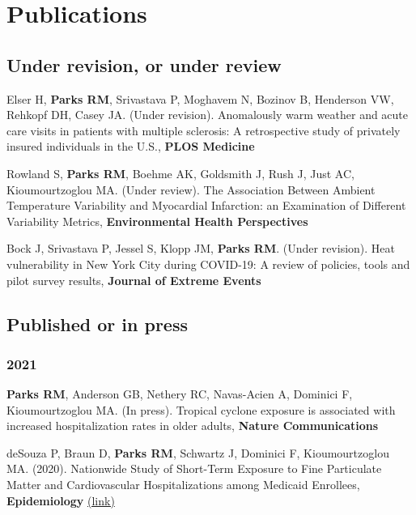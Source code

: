 \section*{Publications}

\subsection*{Under revision, or under review}

\noindent Elser H, \textbf{Parks RM}, Srivastava P, Moghavem N, Bozinov B, Henderson VW, Rehkopf DH, Casey JA. (Under revision). Anomalously warm weather and acute care visits in patients with multiple sclerosis: A retrospective study of privately insured individuals in the U.S., \textbf{PLOS Medicine}

\vspace{2mm}

\noindent Rowland S, \textbf{Parks RM}, Boehme AK, Goldsmith J, Rush J, Just AC, Kioumourtzoglou MA. (Under review). The Association Between Ambient Temperature Variability and Myocardial Infarction: an Examination of Different Variability Metrics, \textbf{Environmental Health Perspectives}

\vspace{2mm}

\noindent Bock J, Srivastava P, Jessel S, Klopp JM, \textbf{Parks RM}. (Under revision). Heat vulnerability in New York City during COVID-19: A review of policies, tools and pilot survey results, \textbf{Journal of Extreme Events}

\subsection*{Published or in press}

\subsubsection*{2021}

\noindent \textbf{Parks RM}, Anderson GB, Nethery RC, Navas-Acien A, Dominici F, Kioumourtzoglou MA. (In press). Tropical cyclone exposure is associated with increased hospitalization rates in older adults, \textbf{Nature Communications}

\vspace{2mm}

\noindent deSouza P, Braun D, \textbf{Parks RM}, Schwartz J, Dominici F, Kioumourtzoglou MA. (2020). Nationwide Study of Short-Term Exposure to Fine Particulate Matter and Cardiovascular Hospitalizations among Medicaid Enrollees, \textbf{Epidemiology} \href{https://doi.org/10.1097/EDE.0000000000001265}{(link)}


